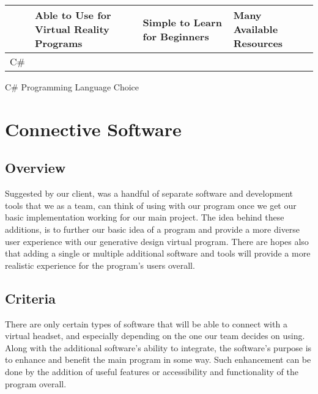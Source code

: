\documentclass[letterpaper,10pt,onecolumn,compsoc]{IEEEtran}
\begin{document}
\begin{center}
\begin{tabular}{ | P{2.5cm} | P{3.5cm} | P{2.75cm} | P{3cm} | } 
 	\hline
 	 & Able to Use for Virtual Reality Programs & Simple to Learn for Beginners & Many Available Resources \\ 
 	\hline 		
 	C\# & \checkmark & \checkmark & \checkmark \\ 
 	\hline
\end{tabular}
\end{center}

\begin{center}
C\# Programming Language Choice
\end{center}

\newpage

\section{Connective Software}
\subsection{Overview}

\noindent
Suggested by our client, was a handful of separate software and development tools that we as a team, can think of using with our program once we get our basic implementation working for our main project. The idea behind these additions, is to further our basic idea of a program and provide a more diverse user experience with our generative design virtual program. There are hopes also that adding a single or multiple additional software and tools will provide a more realistic experience for the program's users overall.

\subsection{Criteria}


\noindent
There are only certain types of software that will be able to connect with a virtual headset, and especially depending on the one our team decides on using. Along with the additional software's ability to integrate, the software's purpose is to enhance and benefit the main program in some way. Such enhancement can be done by the addition of useful features or accessibility and functionality of the program overall.
\end{document}
